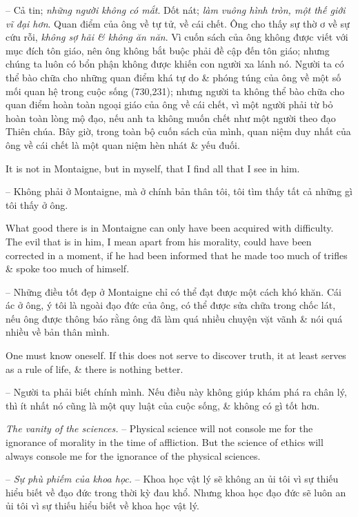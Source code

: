 \documentclass{article}
\begin{document}
\begin{enumerate}
\begin{itemize}
		-- Cả tin; {\it những người không có mắt}. Dốt nát; {\it làm vuông hình tròn, một thế giới vĩ đại hơn}. Quan điểm của ông về tự tử, về cái chết. Ông cho thấy sự thờ ơ về sự cứu rỗi, {\it không sợ hãi \& không ăn năn}. Vì cuốn sách của ông không được viết với mục đích tôn giáo, nên ông không bắt buộc phải đề cập đến tôn giáo; nhưng chúng ta luôn có bổn phận không được khiến con người xa lánh nó. Người ta có thể bào chữa cho những quan điểm khá tự do \& phóng túng của ông về một số mối quan hệ trong cuộc sống (730,231); nhưng người ta không thể bào chữa cho quan điểm hoàn toàn ngoại giáo của ông về cái chết, vì một người phải từ bỏ hoàn toàn lòng mộ đạo, nếu anh ta không muốn chết như một người theo đạo Thiên chúa. Bây giờ, trong toàn bộ cuốn sách của mình, quan niệm duy nhất của ông về cái chết là một quan niệm hèn nhát \& yếu đuối.
		
		 It is not in {\sc Montaigne}, but in myself, that I find all that I see in him.
		
		-- Không phải ở {\sc Montaigne}, mà ở chính bản thân tôi, tôi tìm thấy tất cả những gì tôi thấy ở ông.
		
		 What good there is in {\sc Montaigne} can only have been acquired with difficulty. The evil that is in him, I mean apart from his morality, could have been corrected in a moment, if he had been informed that he made too much of trifles \& spoke too much of himself.
		
		-- Những điều tốt đẹp ở {\sc Montaigne} chỉ có thể đạt được một cách khó khăn. Cái ác ở ông, ý tôi là ngoài đạo đức của ông, có thể được sửa chữa trong chốc lát, nếu ông được thông báo rằng ông đã làm quá nhiều chuyện vặt vãnh \& nói quá nhiều về bản thân mình.
		
		 One must know oneself. If this does not serve to discover truth, it at least serves as a rule of life, \& there is nothing better.
		
		-- Người ta phải biết chính mình. Nếu điều này không giúp khám phá ra chân lý, thì ít nhất nó cũng là một quy luật của cuộc sống, \& không có gì tốt hơn.
		
		 {\it The vanity of the sciences.} -- Physical science will not console me for the ignorance of morality in the time of affliction. But the science of ethics will always console me for the ignorance of the physical sciences.
		
		-- {\it Sự phù phiếm của khoa học.} -- Khoa học vật lý sẽ không an ủi tôi vì sự thiếu hiểu biết về đạo đức trong thời kỳ đau khổ. Nhưng khoa học đạo đức sẽ luôn an ủi tôi vì sự thiếu hiểu biết về khoa học vật lý.
		

\end{itemize}
\end{enumerate}
\end{document}
